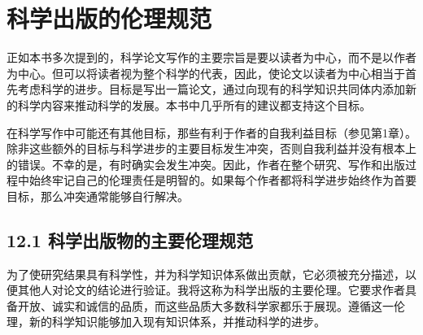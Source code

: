 \section*{科学出版的伦理规范}
正如本书多次提到的，科学论文写作的主要宗旨是要以读者为中心，而不是以作者为中心。但可以将读者视为整个科学的代表，因此，使论文以读者为中心相当于首先考虑科学的进步。目标是写出一篇论文，通过向现有的科学知识共同体内添加新的科学内容来推动科学的发展。本书中几乎所有的建议都支持这个目标。

在科学写作中可能还有其他目标，那些有利于作者的自我利益目标（参见第1章）。除非这些额外的目标与科学进步的主要目标发生冲突，否则自我利益并没有根本上的错误。不幸的是，有时确实会发生冲突。因此，作者在整个研究、写作和出版过程中始终牢记自己的伦理责任是明智的。如果每个作者都将科学进步始终作为首要目标，那么冲突通常能够自行解决。

\subsection*{12.1 科学出版物的主要伦理规范}
为了使研究结果具有科学性，并为科学知识体系做出贡献，它必须被充分描述，以便其他人对论文的结论进行验证。我将这称为科学出版的主要伦理。它要求作者具备开放、诚实和诚信的品质，而这些品质大多数科学家都乐于展现。遵循这一伦理，新的科学知识能够加入现有知识体系，并推动科学的进步。

